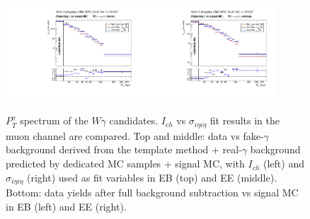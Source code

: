 \begin{figure}[htb]
\begin{center}
\includegraphics[width=0.45\textwidth]{../figs/figs_v11/MUON_WGamma/PrepareYields/c_BkgSubtrDATAvsSIGMC_c_MUON_WGamma__UNblind__Barrel__phoEt.pdf}\includegraphics[width=0.45\textwidth]{../figs/figs_v11/MUON_WGamma/PrepareYields/c_BkgSubtrDATAvsSIGMC_c_MUON_WGamma__UNblind__Endcap__phoEt.pdf}\\
  \caption{$P_T^{\gamma}$ spectrum of the $W\gamma$ candidates. $I_{ch}$ vs $\sigma_{i\eta i\eta}$ fit results in the muon channel are compared. Top and middle: data vs fake-$\gamma$ background derived from the template method + real-$\gamma$ background predicted by dedicated MC samples + signal MC, with $I_{ch}$ (left) and $\sigma_{i\eta i\eta}$ (right) used as fit variables in EB (top) and EE (middle). Bottom: data yields after full background subtraction vs signal MC in EB (left) and EE (right).}
  \label{fig:DDvsMC_Wg_Data_MUON}
  \end{center}
\end{figure}

